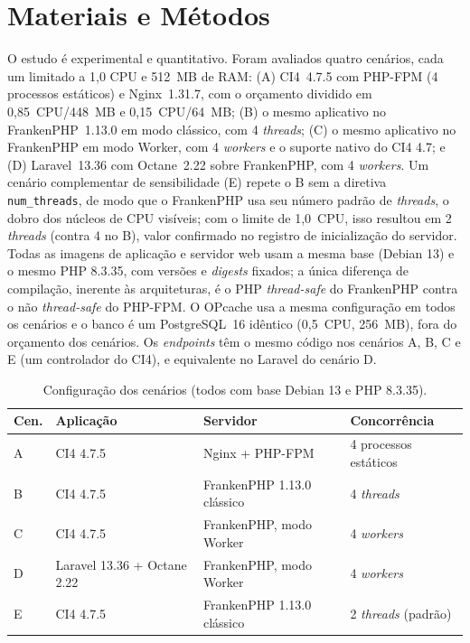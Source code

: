 \section{Materiais e Métodos}
O estudo é experimental e quantitativo. Foram avaliados quatro cenários, cada um limitado a 1,0 CPU e 512~MB de RAM: (A) CI4~4.7.5 com PHP-FPM (4 processos estáticos) e Nginx~1.31.7, com o orçamento dividido em 0,85~CPU/448~MB e 0,15~CPU/64~MB; (B) o mesmo aplicativo no FrankenPHP~1.13.0 em modo clássico, com 4 \textit{threads}; (C) o mesmo aplicativo no FrankenPHP em modo Worker, com 4 \textit{workers} e o suporte nativo do CI4 4.7; e (D) Laravel~13.36 com Octane~2.22 sobre FrankenPHP, com 4 \textit{workers}. Um cenário complementar de sensibilidade (E) repete o B sem a diretiva \texttt{num\_threads}, de modo que o FrankenPHP usa seu número padrão de \textit{threads}, o dobro dos núcleos de CPU visíveis; com o limite de 1,0~CPU, isso resultou em 2 \textit{threads} (contra 4 no B), valor confirmado no registro de inicialização do servidor. Todas as imagens de aplicação e servidor web usam a mesma base (Debian 13) e o mesmo PHP 8.3.35, com versões e \textit{digests} fixados; a única diferença de compilação, inerente às arquiteturas, é o PHP \textit{thread-safe} do FrankenPHP contra o não \textit{thread-safe} do PHP-FPM. O OPcache usa a mesma configuração em todos os cenários e o banco é um PostgreSQL~16 idêntico (0,5~CPU, 256~MB), fora do orçamento dos cenários. Os \textit{endpoints} têm o mesmo código nos cenários A, B, C e E (um controlador do CI4), e equivalente no Laravel do cenário D.

\begin{table}[htb]
  \caption{Configuração dos cenários (todos com base Debian 13 e PHP 8.3.35).}
  \label{tab:config}
  \centering
  \footnotesize
  \setlength{\tabcolsep}{3pt}
  \begin{tabular}{llll}
    \toprule
    \textbf{Cen.} & \textbf{Aplicação} & \textbf{Servidor} & \textbf{Concorrência} \\
    \midrule
    A & CI4 4.7.5 & Nginx + PHP-FPM & 4 processos estáticos \\
    B & CI4 4.7.5 & FrankenPHP 1.13.0 clássico & 4 \textit{threads} \\
    C & CI4 4.7.5 & FrankenPHP, modo Worker & 4 \textit{workers} \\
    D & Laravel 13.36 + Octane 2.22 & FrankenPHP, modo Worker & 4 \textit{workers} \\
    E & CI4 4.7.5 & FrankenPHP 1.13.0 clássico & 2 \textit{threads} (padrão) \\
    \bottomrule
  \end{tabular}
\end{table}


